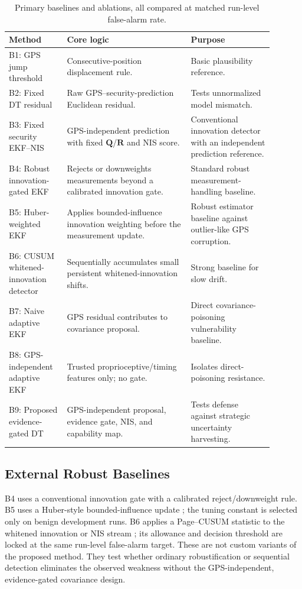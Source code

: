 \documentclass[11pt,a4paper]{article}
\begin{document}
\begin{table}[t]
\centering
\caption{Primary baselines and ablations, all compared at matched run-level false-alarm rate.}
\label{tab:baselines}
\scriptsize
\begin{tabular}{L{0.19\linewidth} L{0.42\linewidth} L{0.28\linewidth}}
\toprule
\textbf{Method} & \textbf{Core logic} & \textbf{Purpose} \\
\midrule
B1: GPS jump threshold & Consecutive-position displacement rule. & Basic plausibility reference. \\
B2: Fixed DT residual & Raw GPS--security-prediction Euclidean residual. & Tests unnormalized model mismatch. \\
B3: Fixed security EKF--NIS & GPS-independent prediction with fixed $\mathbf{Q}$/$\mathbf{R}$ and NIS score. & Conventional innovation detector with an independent prediction reference. \\
B4: Robust innovation-gated EKF & Rejects or downweights measurements beyond a calibrated innovation gate. & Standard robust measurement-handling baseline. \\
B5: Huber-weighted EKF & Applies bounded-influence innovation weighting before the measurement update. & Robust estimator baseline against outlier-like GPS corruption. \\
B6: CUSUM whitened-innovation detector & Sequentially accumulates small persistent whitened-innovation shifts. & Strong baseline for slow drift. \\
B7: Naive adaptive EKF & GPS residual contributes to covariance proposal. & Direct covariance-poisoning vulnerability baseline. \\
B8: GPS-independent adaptive EKF & Trusted proprioceptive/timing features only; no gate. & Isolates direct-poisoning resistance. \\
B9: Proposed evidence-gated DT & GPS-independent proposal, evidence gate, NIS, and capability map. & Tests defense against strategic uncertainty harvesting. \\
\bottomrule
\end{tabular}
\end{table}

\subsection{External Robust Baselines}
B4 uses a conventional innovation gate with a calibrated reject/downweight rule. B5 uses a Huber-style bounded-influence update \cite{huber1981robust}; the tuning constant is selected only on benign development runs. B6 applies a Page--CUSUM statistic to the whitened innovation or NIS stream \cite{page1954}; its allowance and decision threshold are locked at the same run-level false-alarm target. These are not custom variants of the proposed method. They test whether ordinary robustification or sequential detection eliminates the observed weakness without the GPS-independent, evidence-gated covariance design.
\end{document}

